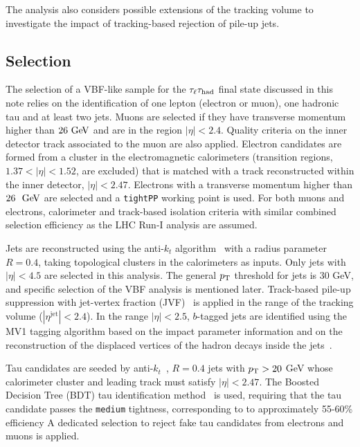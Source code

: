 The analysis also considers possible extensions of the tracking volume to investigate the impact of tracking-based rejection of pile-up jets. 

\subsection{Selection}

The selection of a VBF-like sample for the $\tau_\ell\tau_\text{had}$ final state discussed in this note relies on the identification of one lepton (electron or muon), one hadronic tau and at least two jets. Muons are selected if they have transverse momentum higher than $26 \GeV$ and are in the region $|\eta|<2.4$. Quality criteria on the inner detector track associated to the muon are also applied. Electron candidates are formed from a cluster in the electromagnetic calorimeters (transition regions, $1.37<|\eta|<1.52$, are excluded) that is matched with a track reconstructed within the inner detector, $|\eta|<2.47$. Electrons with a transverse momentum higher than $26~\GeV$ are selected and a \texttt{tightPP} working point is used. For both muons and electrons, calorimeter and track-based isolation criteria with similar combined selection efficiency as the LHC Run-I analysis are assumed.

Jets are reconstructed using the anti-$k_t$ algorithm~\cite{2008.antikt} with a radius parameter $R=0.4$, taking topological clusters in the calorimeters as inputs. Only jets with $|\eta|<4.5$ are selected in this analysis. The general $p_{\mathrm{T}}$ threshold for jets is 30 GeV, and specific selection of the VBF analysis is mentioned later. Track-based pile-up suppression with jet-vertex fraction (JVF)~\cite{ATLAS-CONF-2014-018} is applied in the range of the tracking volume ($|\eta^\text{jet}| < 2.4$). In the range $\left|\eta\right| < 2.5$, $b$-tagged jets are identified using the MV1 tagging algorithm based on the impact parameter information and on the reconstruction of the displaced vertices of the hadron decays inside the jets~\cite{ATLAS-CONF-2014-046}. 

Tau candidates are seeded by anti-$k_t$~\cite{2008.antikt}, $R=0.4$ jets with $p_{\mathrm{T}} > 20$ GeV whose calorimeter cluster and leading track must satisfy $|\eta| < 2.47$. The Boosted Decision Tree (BDT) tau identification method~\cite{PERF-2013-06} is used, requiring that the tau candidate passes the \texttt{medium} tightness, corresponding to to approximately 55-60\% efficiency A dedicated selection to reject fake tau candidates from electrons and muons is applied.

